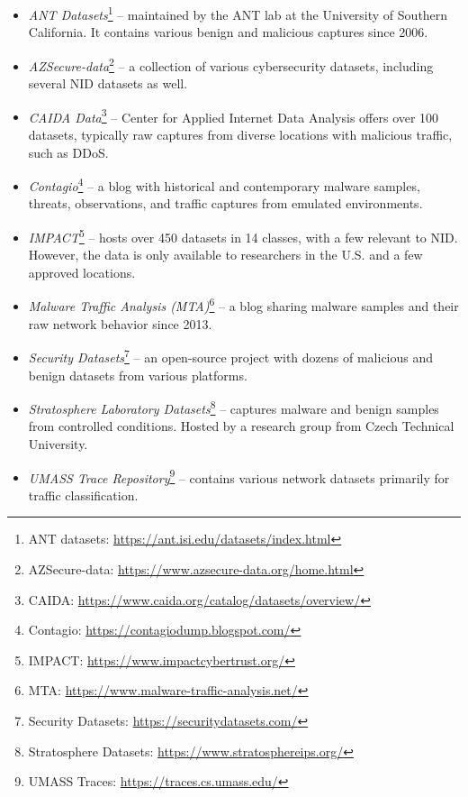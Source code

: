 \begin{itemize}%
    \item \emph{ANT Datasets}\footnote{ANT datasets: \url{https://ant.isi.edu/datasets/index.html}} -- maintained by the ANT lab at the University of Southern California. It contains various benign and malicious captures since 2006.

    \item \emph{AZSecure-data}\footnote{AZSecure-data: \url{https://www.azsecure-data.org/home.html}} -- a collection of various cybersecurity datasets, including several NID datasets as well.

    \item \emph{CAIDA Data}\footnote{CAIDA: \url{https://www.caida.org/catalog/datasets/overview/}} -- Center for Applied Internet Data Analysis offers over 100 datasets, typically raw captures from diverse locations with malicious traffic, such as DDoS.

    \item \emph{Contagio}\footnote{Contagio: \url{https://contagiodump.blogspot.com/}} -- a blog with historical and contemporary malware samples, threats, observations, and traffic captures from emulated environments.

    \item \emph{IMPACT}\footnote{IMPACT: \url{https://www.impactcybertrust.org/}} -- hosts over 450 datasets in 14 classes, with a few relevant to NID. However, the data is only available to researchers in the U.S. and a few approved locations.

    \item \emph{Malware Traffic Analysis (MTA)}\footnote{MTA: \url{https://www.malware-traffic-analysis.net/}} -- a blog sharing malware samples and their raw network behavior since 2013.

    \item \emph{Security Datasets}\footnote{Security Datasets: \url{https://securitydatasets.com/}} -- an open-source project with dozens of malicious and benign datasets from various platforms.

    \item \emph{Stratosphere Laboratory Datasets}\footnote{Stratosphere Datasets: \url{https://www.stratosphereips.org/}} -- captures malware and benign samples from controlled conditions. Hosted by a research group from Czech Technical University.

    \item \emph{UMASS Trace Repository}\footnote{UMASS Traces: \url{https://traces.cs.umass.edu/}} -- contains various network datasets primarily for traffic classification.
\end{itemize}


